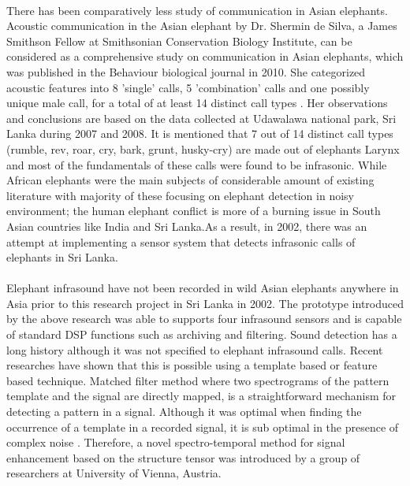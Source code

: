 \documentclass[12pt]{article}
\numberwithin{figure}{section}
\numberwithin{table}{section}
\begin{document}
\paragraph{}
There has been comparatively less study of communication in Asian elephants. Acoustic communication in the Asian elephant by Dr. Shermin de Silva, a  James Smithson Fellow at Smithsonian Conservation Biology Institute, can be considered as a comprehensive study on communication in Asian elephants, which was published in the Behaviour biological journal in 2010. She categorized acoustic features into 8 'single' calls, 5 'combination' calls and one possibly unique male call, for a total of at least 14 distinct call types \cite {19}. Her observations and conclusions are based on the data collected at Udawalawa national park, Sri Lanka during 2007 and 2008. It is mentioned that 7 out of 14 distinct call types (rumble, rev, roar, cry, bark, grunt, husky-cry) are made out of elephants Larynx and most of the fundamentals of these calls were found to be infrasonic. While African elephants were the main subjects of considerable amount of existing literature with majority of these focusing on elephant detection in noisy environment; the human elephant conflict is more of a burning issue in South Asian countries like India and Sri Lanka.As a result, in 2002, there was an attempt at implementing a sensor system that detects infrasonic calls of elephants in Sri Lanka.

\paragraph{}
Elephant infrasound have not been recorded in wild Asian elephants anywhere in Asia prior to this research project in Sri Lanka in 2002. The prototype introduced by the above research was able to supports four infrasound sensors and is capable of standard DSP functions such as archiving and filtering. Sound detection has a long history although it was not specified to elephant infrasound calls. Recent researches have shown that this is possible using a template based or feature based technique. Matched filter method where two spectrograms of the pattern template and the signal are directly mapped, is a straightforward mechanism for detecting a pattern in a signal. Although it was optimal when finding the occurrence of a template in a recorded signal, it is sub optimal in the presence of complex noise \cite {10}. Therefore, a novel spectro-temporal method for signal enhancement based on the structure tensor \cite {11} was introduced by a group of researchers at University of Vienna, Austria. 
\newpage
\end{document}
